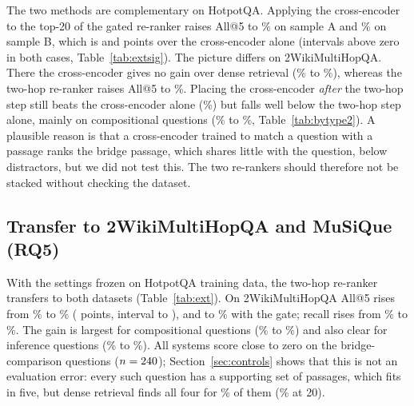 \documentclass[a4paper,fleqn]{cas-sc}
\begin{document}
The two methods are complementary on HotpotQA. Applying the cross-encoder to the top-20 of the gated re-ranker raises All@5 to \ExtHACEGateAll\% on sample A and \ExtHBCEGateAll\% on sample B, which is \ExtHACEGateVCEAllD{} and \ExtHBCEGateVCEAllD{} points over the cross-encoder alone (intervals above zero in both cases, Table~\ref{tab:extsig}). The picture differs on 2WikiMultiHopQA. There the cross-encoder gives no gain over dense retrieval (\ExtTWDenseAll\% to \ExtTWCEAll\%), whereas the two-hop re-ranker raises All@5 to \ExtTWTwoAll\%. Placing the cross-encoder \emph{after} the two-hop step still beats the cross-encoder alone (\ExtTWCETwoAll\%) but falls well below the two-hop step alone, mainly on compositional questions (\TypTWTwocompositional\% to \TypTWCETwocompositional\%, Table~\ref{tab:bytype2}). A plausible reason is that a cross-encoder trained to match a question with a passage ranks the bridge passage, which shares little with the question, below distractors, but we did not test this. The two re-rankers should therefore not be stacked without checking the dataset.


\subsection{Transfer to 2WikiMultiHopQA and MuSiQue (RQ5)}
With the settings frozen on HotpotQA training data, the two-hop re-ranker transfers to both datasets (Table~\ref{tab:ext}). On 2WikiMultiHopQA All@5 rises from \ExtTWDenseAll\% to \ExtTWTwoAll\% (\ExtTWTwoVDenseAllD{} points, interval \ExtTWTwoVDenseAllLo{} to \ExtTWTwoVDenseAllHi{}), and to \ExtTWGateAll\% with the gate; recall rises from \ExtTWDenseRec\% to \ExtTWTwoRec\%. The gain is largest for compositional questions (\TypTWDensecompositional\% to \TypTWTwocompositional\%) and also clear for inference questions (\TypTWDenseinference\% to \TypTWTwoinference\%). All systems score close to zero on the bridge-comparison questions ($n=240$); Section~\ref{sec:controls} shows that this is not an evaluation error: every such question has a supporting set of \AudSizeBridgecomparison{} passages, which fits in five, but dense retrieval finds all four for \AudDenseBridgecomparisonAll\% of them (\AudDenseBridgecomparisonAllTwenty\% at 20).
\end{document}
